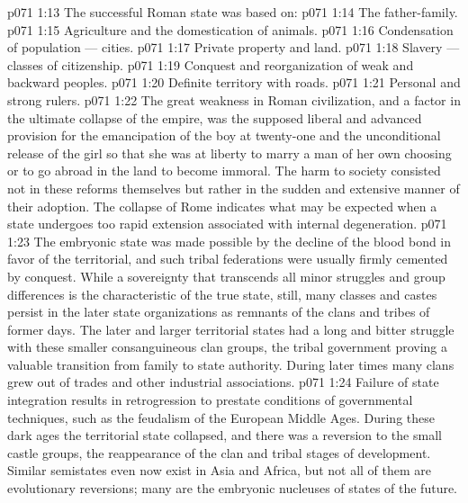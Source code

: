 \vs p071 1:13 \pc The successful Roman state was based on:
\vs p071 1:14 \bibnobreakspace The father\hyp{}family.
\vs p071 1:15 \bibnobreakspace Agriculture and the domestication of animals.
\vs p071 1:16 \bibnobreakspace Condensation of population --- cities.
\vs p071 1:17 \bibnobreakspace Private property and land.
\vs p071 1:18 \bibnobreakspace Slavery --- classes of citizenship.
\vs p071 1:19 \bibnobreakspace Conquest and reorganization of weak and backward peoples.
\vs p071 1:20 \bibnobreakspace Definite territory with roads.
\vs p071 1:21 \bibnobreakspace Personal and strong rulers.
\vs p071 1:22 \pc The great weakness in Roman civilization, and a factor in the ultimate collapse of the empire, was the supposed liberal and advanced provision for the emancipation of the boy at twenty\hyp{}one and the unconditional release of the girl so that she was at liberty to marry a man of her own choosing or to go abroad in the land to become immoral. The harm to society consisted not in these reforms themselves but rather in the sudden and extensive manner of their adoption. The collapse of Rome indicates what may be expected when a state undergoes too rapid extension associated with internal degeneration.
\vs p071 1:23 \pc The embryonic state was made possible by the decline of the blood bond in favor of the territorial, and such tribal federations were usually firmly cemented by conquest. While a sovereignty that transcends all minor struggles and group differences is the characteristic of the true state, still, many classes and castes persist in the later state organizations as remnants of the clans and tribes of former days. The later and larger territorial states had a long and bitter struggle with these smaller consanguineous clan groups, the tribal government proving a valuable transition from family to state authority. During later times many clans grew out of trades and other industrial associations.
\vs p071 1:24 Failure of state integration results in retrogression to prestate conditions of governmental techniques, such as the feudalism of the European Middle Ages. During these dark ages the territorial state collapsed, and there was a reversion to the small castle groups, the reappearance of the clan and tribal stages of development. Similar semistates even now exist in Asia and Africa, but not all of them are evolutionary reversions; many are the embryonic nucleuses of states of the future.
